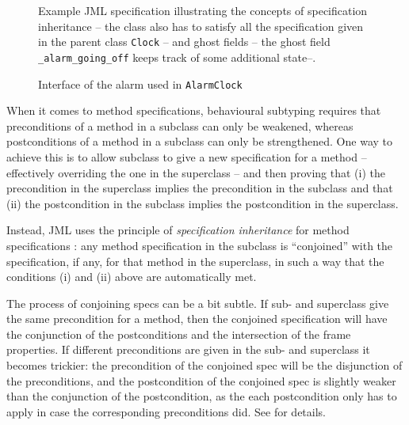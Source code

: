 \documentclass{llncs}
\begin{document}
\begin{figure}[tbp] \label{Example:alarmclock}
%

%
\vspace*{-2ex} %
\caption{Example JML specification illustrating the concepts of 
specification inheritance -- the class also has to satisfy all
the specification given in the parent class \texttt{Clock} -- and 
ghost fields -- the ghost field \texttt{\_alarm\_going\_off}
keeps track of some additional state--.}
\end{figure}

\begin{figure}[tbp] \label{Example:alarminterface}
%

%
\vspace*{-2ex} %
\caption{Interface of the alarm used in \texttt{AlarmClock}}
\end{figure}

When it comes to method specifications, behavioural subtyping requires
that preconditions of a method in a subclass can only  be weakened,
whereas postconditions of a method in a subclass can only  be strengthened.
One way to achieve this is to allow subclass to give a new specification
for a method -- effectively overriding the one in the superclass --
and then proving that (i) the precondition in the superclass implies the
precondition in the subclass and that (ii) the postcondition in the subclass
implies the postcondition in the superclass.

Instead, JML uses the principle of \emph{specification inheritance} 
for method specifications \cite{Dhara-Leavens96}: any method specification
in the subclass is ``conjoined'' with the specification, if any, for that
method in the superclass, in such a way that the conditions (i) and (ii) above 
are automatically met.

The process of conjoining specs can be a bit subtle.  If sub- and superclass
give the same precondition for a method, then the conjoined specification will
have the conjunction of the postconditions and the intersection of the frame
properties.  If different preconditions are given in the sub- and superclass it
becomes trickier: the precondition of the conjoined spec will be the
disjunction of the preconditions, and the postcondition of the conjoined spec
is slightly weaker than the conjunction of the postcondition, as the each
postcondition only has to apply in case the corresponding preconditions did.
See \cite{Dhara-Leavens96} for details.
\end{document}
